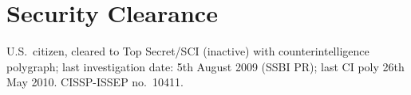 \section*{Security Clearance}
\vspace{-2mm}

U.S.\ citizen, cleared to Top Secret/SCI (inactive) with
counterintelligence polygraph; last investigation date: 5th August 2009
(SSBI PR); last CI poly 26th May 2010. CISSP-ISSEP no.\ 10411.

